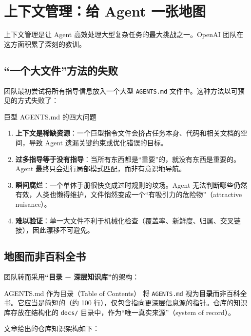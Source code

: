 \documentclass[a4paper]{article}
\begin{document}
\newpage

\section{上下文管理：给 Agent 一张地图}

上下文管理是让 Agent 高效处理大型复杂任务的最大挑战之一。OpenAI 团队在这方面积累了深刻的教训。

\subsection{``一个大文件''方法的失败}

团队最初尝试将所有指导信息放入一个大型 \texttt{AGENTS.md} 文件中。这种方法以可预见的方式失败了：

\begin{warningbox}{巨型 AGENTS.md 的四大问题}
\begin{enumerate}[nosep]
  \item \textbf{上下文是稀缺资源}：一个巨型指令文件会挤占任务本身、代码和相关文档的空间，导致 Agent 遗漏关键约束或优化错误的目标。
  \item \textbf{过多指导等于没有指导}：当所有东西都是``重要''的，就没有东西是重要的。Agent 最终只会进行局部模式匹配，而非有意识地导航。
  \item \textbf{瞬间腐烂}：一个单体手册很快变成过时规则的坟场。Agent 无法判断哪些仍然有效，人类也懒得维护，文件悄然变成一个``有吸引力的危险物''（attractive nuisance）。
  \item \textbf{难以验证}：单一大文件不利于机械化检查（覆盖率、新鲜度、归属、交叉链接），因此漂移不可避免。
\end{enumerate}
\end{warningbox}

\subsection{地图而非百科全书}

团队转而采用\textbf{``目录 + 深层知识库''}的架构：

\begin{importantbox}{AGENTS.md 作为目录（Table of Contents）}
将 \texttt{AGENTS.md} 视为\textbf{目录}而非百科全书。它应当是简短的（约 100 行），仅包含指向更深层信息源的指针。仓库的知识库存放在结构化的 \texttt{docs/} 目录中，作为``唯一真实来源''（system of record）。
\end{importantbox}

文章给出的仓库知识架构如下：
\end{document}
